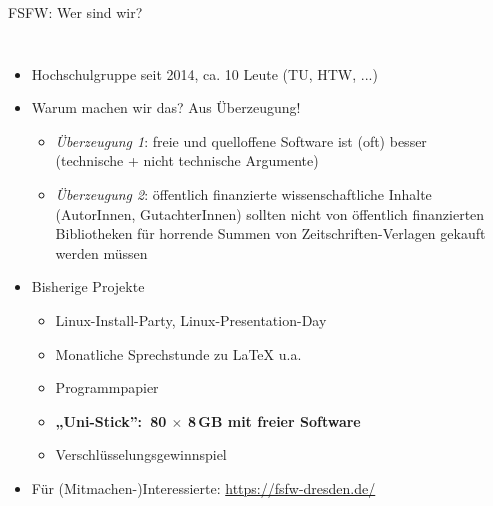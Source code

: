 \documentclass{beamer}
\begin{document}
\begin{frame}[label=ct1]{FSFW: Wer sind wir?}

  \begin{columns}
 
\vspace{-5mm}

  \begin{itemize}
  \item Hochschulgruppe seit 2014, ca. 10 Leute (TU, HTW, ...)
  \item Warum machen wir das? Aus Überzeugung!


  \begin{itemize}
  \item \emph{Überzeugung 1}: freie und quelloffene Software ist (oft) besser\\
    (technische + nicht technische Argumente)\\
    \bigskip
    \pause
  \item \emph{Überzeugung 2}: öffentlich finanzierte wissenschaftliche Inhalte
    (AutorInnen, GutachterInnen) sollten nicht von öffentlich finanzierten
    Bibliotheken für horrende Summen von Zeitschriften-Verlagen gekauft werden
    müssen
  \end{itemize}

    \pause
  \item Bisherige Projekte
    \begin{itemize}
    \item Linux-Install-Party, Linux-Presentation-Day
    \item Monatliche Sprechstunde zu \LaTeX{} u.a.
    \item Programmpapier
    \item \textbf<4-5>{„Uni-Stick”:~80 $\times$ 8\,GB mit freier Software}
    \item Verschlüsselungsgewinnspiel
    \end{itemize}
    \pause
    \pause
    \pause
    \item Für (Mitmachen-)Interessierte: \url{https://fsfw-dresden.de/}
  \end{itemize}
  

\end{columns}
\end{frame}
\end{document}
